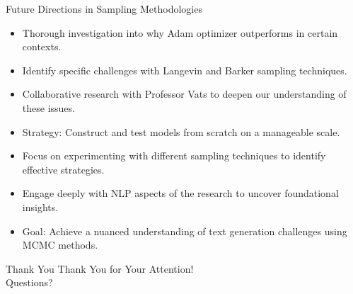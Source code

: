 \documentclass{beamer}
\begin{document}
\begin{frame}{Future Directions in Sampling Methodologies}
    \begin{itemize}
        \item Thorough investigation into why Adam optimizer outperforms in certain contexts.
        \item Identify specific challenges with Langevin and Barker sampling techniques.
        \item Collaborative research with Professor Vats to deepen our understanding of these issues.
        \item Strategy: Construct and test models from scratch on a manageable scale.
        \item Focus on experimenting with different sampling techniques to identify effective strategies.
        \item Engage deeply with NLP aspects of the research to uncover foundational insights.
        \item Goal: Achieve a nuanced understanding of text generation challenges using MCMC methods.
    \end{itemize}
\end{frame}


\begin{frame}{Thank You}
    \centering
    \LARGE Thank You for Your Attention!\\[10pt]
    \normalsize Questions?
\end{frame}

\end{document}
